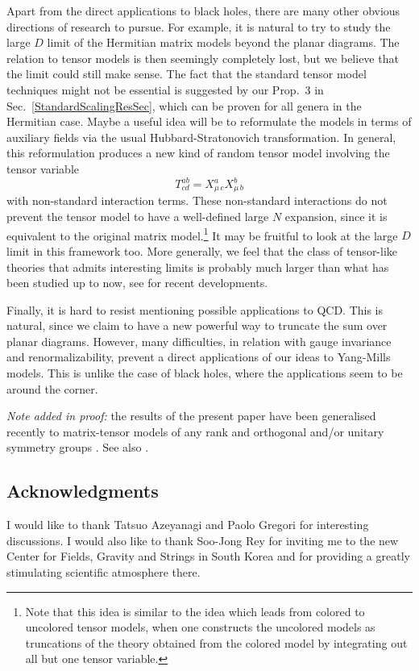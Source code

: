 \documentclass[12pt]{article}
\numberwithin{equation}{section}
\def\be{\begin{equation}}\def\ee{\end{equation}}
\begin{document}
Apart from the direct applications to black holes, there are many other obvious directions of research to pursue. For example, it is natural to try to study the large $D$ limit of the Hermitian matrix models beyond the planar diagrams. The relation to tensor models is then seemingly completely lost, but we believe that the limit could still make sense. The fact that the standard tensor model techniques might not be essential is suggested by our Prop.\ 3 in Sec.\ \ref{StandardScalingResSec}, which can be proven for all genera in the Hermitian case. Maybe a useful idea will be to reformulate the models in terms of auxiliary fields via the usual Hubbard-Stratonovich transformation. In general, this reformulation produces a new kind of random tensor model involving the tensor variable
%
\be\label{Auxvar} T^{ab}_{cd}=X^{a}_{\mu\, c}X^{b}_{\mu\, b}\ee
%
with non-standard interaction terms. These non-standard interactions do not prevent the tensor model to have a well-defined large $N$ expansion, since it is equivalent to the original matrix model.\footnote{Note that this idea is similar to the idea which leads from colored to uncolored tensor models, when one constructs the uncolored models as truncations of the theory obtained from the colored model by integrating out all but one tensor variable.} It may be fruitful to look at the large $D$ limit in this framework too. More generally, we feel that the class of tensor-like theories that admits interesting limits is probably much larger than what has been studied up to now, see \cite{Hermitiantrace, Fermult} for recent developments.

Finally, it is hard to resist mentioning possible applications to QCD. This is natural, since we claim to have a new powerful way to truncate the sum over planar diagrams. However, many difficulties, in relation with gauge invariance and renormalizability, prevent a direct applications of our ideas to Yang-Mills models. This is unlike the case of black holes, where the applications seem to be around the corner.

\noindent\emph{Note added in proof:} the results of the present paper have been generalised recently to matrix-tensor models of any rank and orthogonal and/or unitary symmetry groups \cite{FRV}. See also \cite{Fermult}.

%
\subsection*{Acknowledgments}
%

I would like to thank Tatsuo Azeyanagi and Paolo Gregori for interesting discussions. I would also like to thank Soo-Jong Rey for inviting me to the new Center for Fields, Gravity and Strings in South Korea and for providing a greatly stimulating scientific atmosphere there.
\end{document}

